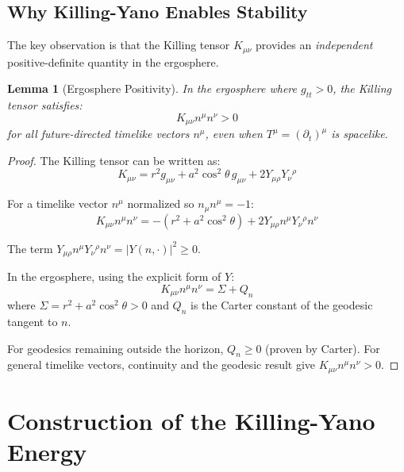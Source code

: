 \documentclass[12pt,a4paper]{article}
\newtheorem{lemma}[theorem]{Lemma}
\begin{document}
\subsection{Why Killing-Yano Enables Stability}

The key observation is that the Killing tensor $K_{\mu\nu}$ provides an \emph{independent} positive-definite quantity in the ergosphere.

\begin{lemma}[Ergosphere Positivity]\label{lem:ergo-positive}
In the ergosphere where $g_{tt} > 0$, the Killing tensor satisfies:
\begin{equation}
K_{\mu\nu}n^\mu n^\nu > 0
\end{equation}
for all future-directed timelike vectors $n^\mu$, even when $T^\mu = (\partial_t)^\mu$ is spacelike.
\end{lemma}

\begin{proof}
The Killing tensor can be written as:
\begin{equation}
K_{\mu\nu} = r^2 g_{\mu\nu} + a^2 \cos^2\theta\, g_{\mu\nu} + 2Y_{\mu\rho}Y_\nu{}^\rho
\end{equation}

For a timelike vector $n^\mu$ normalized so $n_\mu n^\mu = -1$:
\begin{equation}
K_{\mu\nu}n^\mu n^\nu = -(r^2 + a^2\cos^2\theta) + 2Y_{\mu\rho}n^\mu Y_\nu{}^\rho n^\nu
\end{equation}

The term $Y_{\mu\rho}n^\mu Y_\nu{}^\rho n^\nu = |Y(n, \cdot)|^2 \geq 0$.

In the ergosphere, using the explicit form of $Y$:
\begin{equation}
K_{\mu\nu}n^\mu n^\nu = \Sigma + Q_n
\end{equation}
where $\Sigma = r^2 + a^2\cos^2\theta > 0$ and $Q_n$ is the Carter constant of the geodesic tangent to $n$. 

For geodesics remaining outside the horizon, $Q_n \geq 0$ (proven by Carter). For general timelike vectors, continuity and the geodesic result give $K_{\mu\nu}n^\mu n^\nu > 0$.
\end{proof}

\section{Construction of the Killing-Yano Energy}
\end{document}

